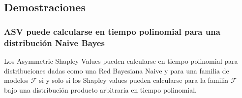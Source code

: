 \subsection{Demostraciones}

\subsubsection{ASV puede calcularse en tiempo polinomial para una distribución Naive Bayes} \label{subsubSection:proofASVPolynomialNaiveBayes}

\begin{theorem}
Los Asymmetric Shapley Values pueden calcularse en tiempo polinomial para distribuciones dadas como una Red Bayesiana Naive y para una familia de modelos \(\mathcal{F}\) si y solo si los Shapley values pueden calcularse para la familia \(\mathcal{F}\) bajo una distribución producto arbitraria en tiempo polinomial.
\end{theorem}

